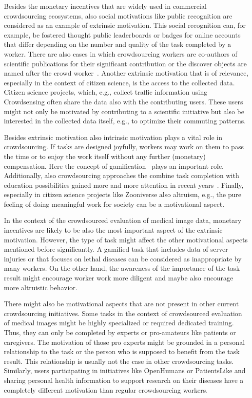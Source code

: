 \documentclass[10pt,twocolumn,letterpaper]{article}
\begin{document}
Besides the monetary incentives that are widely used in commercial crowdsourcing ecosystems, also social motivations like public recognition are considered as an example of extrinsic motivation.
This social recognition can, for example, be fostered thought public leaderboards or badges for online accounts that differ depending on the number and quality of the task completed by a worker.
There are also cases in which crowdsourcing workers are co-authors of scientific publications for their significant contribution or the discover objects are named after the crowd worker~\cite{jozsa2009revealing}.
Another extrinsic motivation that is of relevance, especially in the context of citizen science, is the access to the collected data.
Citizen science projects, which, e.g., collect traffic information using Crowdsensing often share the data also with the contributing users.
These users might not only be motivated by contributing to a scientific initiative but also be interested in the collected data itself, e.g., to optimize their commuting patterns.

Besides extrinsic motivation also intrinsic motivation plays a vital role in crowdsourcing.
If tasks are designed joyfully, workers may work on them to pass the time or to enjoy the work itself without any further (monetary) compensation.
Here the concept of gamification~\cite{deterding2011game} plays an important role.
Additionally, also crowdsourcing approaches the combine task completion with education possibilities gained more and more attention in recent years~\cite{garcia2013learning}. 
Finally, especially in citizen science projects like Zooniverse also altruism, e.g., the pure feeling of doing meaningful work for society can be a motivational aspect. 

In the context of the crowdsourced evaluation of medical image data, monetary incentives are likely to be also the most important aspect of the extrinsic motivation.
However, the type of task might affect the other motivational aspects mentioned before significantly.
A gamified task that includes data of server injuries or that focuses on lethal diseases can be considered as inappropriate by many workers.
On the other hand, the awareness of the importance of the task result might encourage worker work more diligent and maybe also encourage more altruistic behavior.

There might also be motivational aspects that are not present in other current crowdsourcing initiatives.
Some tasks in the context of crowdsourced evaluation of medical images might be highly specialized or required dedicated training.
Thus, they can only be completed by experts or pro-amateurs like patients or caregivers.
The motivation of those pro experts might be grounded in a personal relationship to the task or the person who is supposed to benefit from the task result.
This relationship is usually not the case in other crowdsourcing tasks.
Similarly, users participating in initiatives like OpenHumans or PatientsLike and sharing personal health information to support research on their diseases have a completely different motivation than regular crowdsourcing workers.
\end{document}
